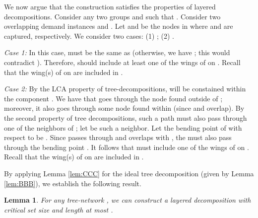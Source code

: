 \documentclass[11pt]{article}
\newtheorem{lemma}[theorem]{\bf Lemma}
\newcommand{\qed} {\hfill}
\begin{document}
We now argue that the construction satisfies the properties of layered decompositions.
Consider any two groups  and  such that .
Consider two overlapping demand instances  and . 
Let  and  be the nodes in  where  and  are captured, respectively.
We consider two cases: (1) ; (2) . 

{\it Case 1: } In this case,  must be the same as  
(otherwise, we have ; this would contradict ).
Therefore,  should include at least one of the wings of  on . 
Recall that the wing(s) of  on  are included in .

{\it Case 2: }
By the LCA property of tree-decompositions,  will be constained within the component .
We have that  goes through the node  found outside of ;
moreover, it also goes through some node found within  (since  and  overlap).
By the second property of tree decompositions, such a path must also 
pass through one of the neighbors of ; let  be such a neighbor.
Let the bending point of  with respect to  be .
Since  passes through  and overlaps with ,
the  must also pass through the bending point . 
It follows that  must include one of the wings of  on .
Recall that the wing(s) of  on  are included in .
\qed

By applying Lemma \ref{lem:CCC} for the ideal tree decomposition (given by Lemma \ref{lem:BBB}),
we establish the following result.

\begin{lemma}
\label{lem:DDD}
For any tree-network , we can construct a layered decomposition with 
critical set size  and length at most .
\end{lemma}
\end{document}
